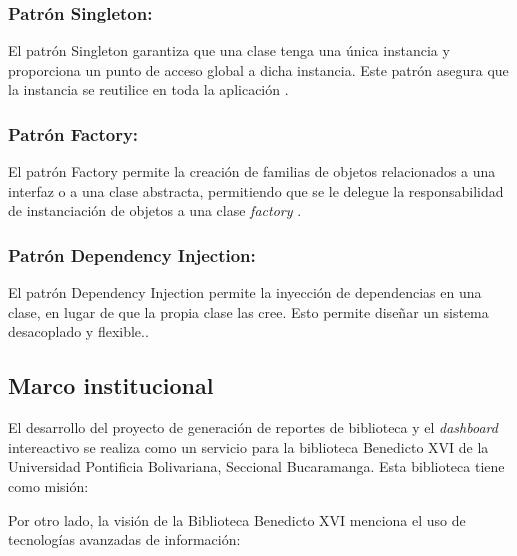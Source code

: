 \documentclass[spanish]{ieee_upb}
\begin{document}
    \subsubsection{Patrón Singleton:} El patrón Singleton garantiza que una clase tenga una única instancia y proporciona un punto de acceso global a dicha instancia. Este patrón asegura que la instancia se reutilice en toda la aplicación \cite{gamma1994design}.
  
  \subsubsection{Patrón Factory:} El patrón Factory permite la creación de familias de objetos relacionados a una interfaz o a una clase abstracta, permitiendo que se le delegue la responsabilidad de instanciación de objetos a una clase \textit{factory} \cite{gamma1994design}.

  \subsubsection{Patrón Dependency Injection:} El patrón Dependency Injection permite la inyección de dependencias en una clase, en lugar de que la propia clase las cree. Esto permite diseñar un sistema desacoplado y flexible.\cite{gamma1994design}.



\subsection{Marco institucional}


El desarrollo del proyecto de generación de reportes de biblioteca y el \textit{dashboard} intereactivo se realiza como un servicio para la biblioteca Benedicto XVI de la Universidad Pontificia Bolivariana, Seccional Bucaramanga. Esta biblioteca tiene como misión:


Por otro lado, la visión de la Biblioteca Benedicto XVI menciona el uso de tecnologías avanzadas de información:

\end{document}
